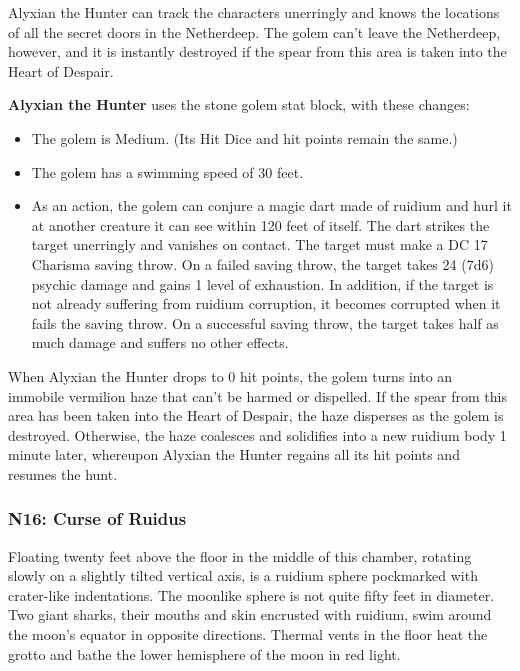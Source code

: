 \documentclass[10pt,a4paper,twoside,twocolumn,openany,nodeprecatedcode]{dndbook}
\begin{document}
Alyxian the Hunter can track the characters unerringly and knows the locations of all the secret doors in the Netherdeep. The golem can't leave the Netherdeep, however, and it is instantly destroyed if the spear from this area is taken into the Heart of Despair.

\textbf{Alyxian the Hunter} uses the stone golem stat block, with these changes:


\begin{itemize}
\item The golem is Medium. (Its Hit Dice and hit points remain the same.)
\item The golem has a swimming speed of 30 feet.
\item As an action, the golem can conjure a magic dart made of ruidium and hurl it at another creature it can see within 120 feet of itself. The dart strikes the target unerringly and vanishes on contact. The target must make a DC 17 Charisma saving throw. On a failed saving throw, the target takes 24 (7d6) psychic damage and gains 1 level of exhaustion. In addition, if the target is not already suffering from ruidium corruption, it becomes corrupted when it fails the saving throw. On a successful saving throw, the target takes half as much damage and suffers no other effects.
\end{itemize}

When Alyxian the Hunter drops to 0 hit points, the golem turns into an immobile vermilion haze that can't be harmed or dispelled. If the spear from this area has been taken into the Heart of Despair, the haze disperses as the golem is destroyed. Otherwise, the haze coalesces and solidifies into a new ruidium body 1 minute later, whereupon Alyxian the Hunter regains all its hit points and resumes the hunt.

\subsubsection{N16: Curse of Ruidus}
\begin{DndReadAloud}{}
Floating twenty feet above the floor in the middle of this chamber, rotating slowly on a slightly tilted vertical axis, is a ruidium sphere pockmarked with crater-like indentations. The moonlike sphere is not quite fifty feet in diameter. Two giant sharks, their mouths and skin encrusted with ruidium, swim around the moon's equator in opposite directions. Thermal vents in the floor heat the grotto and bathe the lower hemisphere of the moon in red light.

\end{DndReadAloud}
\end{document}
